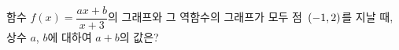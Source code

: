 함수 $f(x)=\dfrac{ax+b}{x+3}$의 그래프와 그 역함수의 그래프가 모두 점~$(-1{,}\mkern3mu\mathopen{}2)$를 지날 때, 상수 $a$, $b$에 대하여 $a+b$의 값은?

